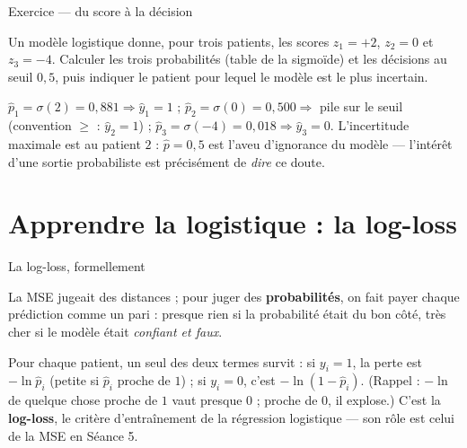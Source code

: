 \documentclass[aspectratio=169,11pt]{beamer}
\begin{document}
\begin{frame}{Exercice — du score à la décision}
\begin{ucadrec}[Énoncé]
{\small Un modèle logistique donne, pour trois patients, les scores $z_1 = +2$, $z_2 = 0$ et $z_3 = -4$. Calculer les trois probabilités (table de la sigmoïde) et les décisions au seuil $0{,}5$, puis indiquer le patient pour lequel le modèle est le plus incertain.}
\end{ucadrec}
\pause
\begin{ucadex}[Correction]
{\small $\hat p_1 = \sigma(2) = 0{,}881 \Rightarrow \hat y_1 = 1$ ; $\hat p_2 = \sigma(0) = 0{,}500 \Rightarrow$ pile sur le seuil (convention $\geq$ : $\hat y_2 = 1$) ; $\hat p_3 = \sigma(-4) = 0{,}018 \Rightarrow \hat y_3 = 0$. L'incertitude maximale est au patient $2$ : $\hat p = 0{,}5$ est l'aveu d'ignorance du modèle — l'intérêt d'une sortie probabiliste est précisément de \emph{dire} ce doute.}
\end{ucadex}
\end{frame}

\section{Apprendre la logistique : la log-loss}

\begin{frame}{La log-loss, formellement}
\begin{ucaddef}
{\small La MSE jugeait des distances ; pour juger des \textbf{probabilités}, on fait payer chaque prédiction comme un pari : presque rien si la probabilité était du bon côté, très cher si le modèle était \emph{confiant et faux}.}
\end{ucaddef}
{\small Pour chaque patient, un seul des deux termes survit : si $y_i = 1$, la perte est $-\ln \hat p_i$ (petite si $\hat p_i$ proche de $1$) ; si $y_i = 0$, c'est $-\ln(1-\hat p_i)$. (Rappel : $-\ln$ de quelque chose proche de $1$ vaut presque $0$ ; proche de $0$, il explose.) C'est la \textbf{log-loss}, le critère d'entraînement de la régression logistique — son rôle est celui de la MSE en Séance 5.}
\end{frame}
\end{document}
